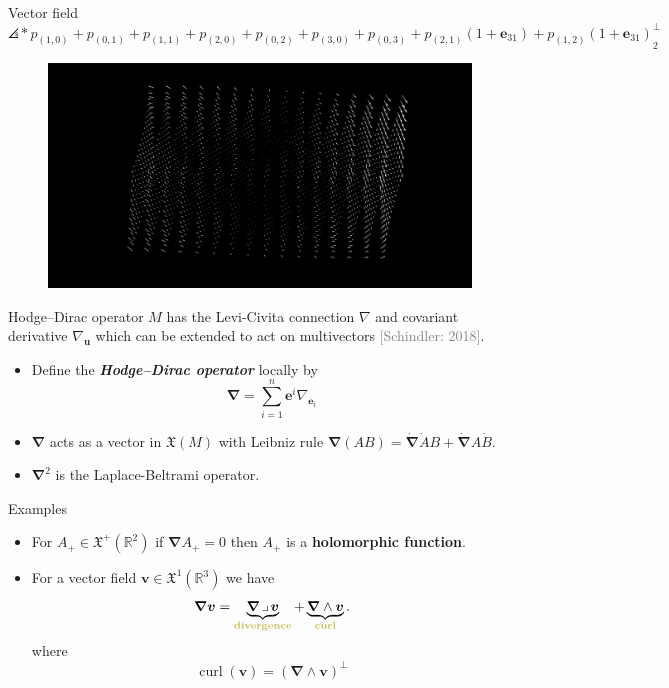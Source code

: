 \documentclass[aspectratio=169,handout]{beamer}
\newcommand\boldgreen[1]{\textcolor{lighter_csu_green}{\emph{\textbf{#1}}}}
\newcommand\boldgold[1]{\textcolor{csu_gold}{\textbf{#1}}}
\newcommand\grey[1]{\textcolor{gray}{#1}}
\newcommand{\R}{\mathbb{R}}
\newcommand{\grad}{\boldsymbol{\nabla}}
\newcommand{\blade}[1]{\boldsymbol{#1}}
\newcommand{\contract}{\hspace*{.5mm} \lrcorner \hspace*{.5mm}}
\DeclarePairedDelimiter\angles{\langle}{\rangle}
\newcommand{\proj}[2]{\angles*{#2}_{#1}}
\newcommand{\smoothfields}{\mathfrak{X}}
\begin{document}
\begin{frame}{Vector field}
\vfill
\hspace*{-.5cm}$\proj{2}{p_{(1,0)}+p_{(0,1)} + p_{(1,1)} + p_{(2,0)} + p_{(0,2)} + p_{(3,0)} + p_{(0,3)} + p_{(2,1)} (1+\blade{e}_{31}) + p_{(1,2)} (1+\blade{e}_{31}) }^\perp$
\begin{figure}[h]
    \centering
    \includegraphics[width=\textwidth]{figures/vector_field}
\end{figure}
\hfill
\vfill
\end{frame}

\begin{frame}{Hodge--Dirac operator}
\vfill
\pause
    $M$ has the Levi-Civita connection $\nabla$ and covariant derivative $\nabla_{\blade{u}}$ which can be extended to act on multivectors \grey{[Schindler: 2018]}.
    \pause
    \begin{itemize}
        \item Define the \boldgreen{Hodge--Dirac operator} locally by
        \[
        \grad = \sum_{i=1}^n \blade{e}^i \nabla_{\blade{e}_i}
        \]
        \pause
        \item $\grad$ acts as a vector in $\smoothfields(M)$ with Leibniz rule $\grad(AB) = \dot{\grad}\dot{A}B + \dot{\grad}A\dot{B}$.
        \pause
        \item $\grad^2$ is the Laplace-Beltrami operator.
    \end{itemize}
\vfill
\end{frame}

\begin{frame}{Examples}
\vfill
\begin{itemize}
\pause
\item For $A_+ \in \smoothfields^+(\R^2)$ if $\grad A_+=0$ then $A_+$ is a \boldgold{holomorphic function}.
\pause
\item For a vector field $\blade{v}\in \smoothfields^1(\R^3)$ we have
    \[
    \grad \blade{v} = \underbrace{\grad \contract \blade{v}}_{\textrm{\boldgold{divergence}}} + \underbrace{\grad \wedge \blade{v}}_{\textrm{\boldgold{curl}}}.
    \]
where
\[
    \operatorname{curl}(\blade{v}) = (\grad \wedge \blade{v})^\perp
\]
\end{itemize}
\vfill
\end{frame}
\end{document}
